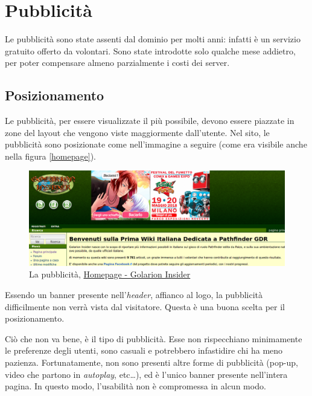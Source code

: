 \section{Pubblicità}

Le pubblicità sono state assenti dal dominio per molti anni: infatti è un servizio gratuito
offerto da volontari. Sono state introdotte solo qualche mese addietro, per poter compensare
almeno parzialmente i costi dei server.

\subsection{Posizionamento}
Le pubblicità, per essere visualizzate il più possibile, devono essere piazzate in zone del
layout che vengono viste maggiormente dall'utente. Nel sito, le pubblicità sono posizionate
come nell'immagine a seguire (come era visibile anche nella figura \ref{homepage}).

\begin{figure}[hbt]
    \includegraphics[width=\textwidth]{img/pubblicita.png}
    \caption{La pubblicità, \href{http://golarion.altervista.org/wiki/Pagina_principale}{Homepage - Golarion Insider}}
\end{figure}

Essendo un banner presente nell'\emph{header}, affianco al logo, la pubblicità difficilmente non verrà vista 
dal visitatore. Questa è una buona scelta per il posizionamento.\par
Ciò che non va bene, è il tipo di pubblicità. Esse non rispecchiano minimamente le preferenze degli utenti, 
sono casuali e potrebbero infastidire chi ha meno pazienza.
Fortunatamente, non sono presenti altre forme di pubblicità (pop-up, video che partono in \emph{autoplay}, etc\dots),
ed è l'unico banner presente nell'intera pagina. In questo modo, l'usabilità non è compromessa in alcun modo.